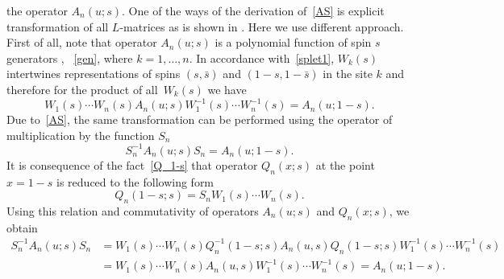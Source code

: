 \documentclass[10pt,a4paper]{amsart}
\numberwithin{equation}{section}
\begin{document}
the operator $A_n(u;s)$.
One of the ways of the derivation of~\eqref{AS} is
explicit transformation of all $L$-matrices
as is shown in \cite{BDM}. Here we use different approach.
First of all, note that operator $A_n(u;s)$ is a polynomial function of spin $s$
generators , ~\eqref{gen}, where $k=1,\dots,n$.
In accordance with~\eqref{splet1}, $W_k(s)$ intertwines representations of spins $(s,\bar{s})$ and $(1-s,1-\bar{s})$ in the site $k$ and therefore
for the product of all~$W_k(s)$ we have
\begin{equation*}
W_1(s)\cdots W_n(s)
A_n(u;s) W^{-1}_1(s)\cdots W^{-1}_n(s) = A_n(u;1-s) .
\end{equation*}
Due to~\eqref{AS}, the same transformation can be performed using the operator of
multiplication by the function $S_n$
\begin{equation*}
S^{-1}_n A_n(u;s) S_n = A_n(u;1-s) .
\end{equation*}
It is consequence of the fact~\eqref{Q_1-s} that operator
$Q_n(x; s)$ at the point $x=1-s$ is reduced to the
following form
\begin{equation*}
	Q_n(1-s; s) = S_n W_1(s) \cdots W_n(s) .
\end{equation*}
Using this relation and commutativity of operators
$A_n(u;s)$ and $Q_n(x; s)$, we obtain
\begin{align*}
S^{-1}_n A_n(u;s) S_n
& =
W_1(s)\cdots W_n(s) Q^{-1}_n(1-s; s)
A_n(u,s) Q_n(1-s; s)
W^{-1}_1(s)\cdots W^{-1}_n(s) \\
& =
W_1(s)\cdots W_n(s)
A_n(u,s) W^{-1}_1(s)\cdots W^{-1}_n(s) = A_n(u;1-s) .
\end{align*}
\end{document}
